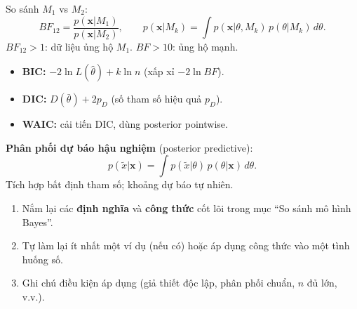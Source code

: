\documentclass[12pt,a4paper]{article}
\begin{document}
\begin{dinhnghia}[title={Bayes factor}]
  So sánh $M_1$ vs $M_2$:
  \[
    BF_{12} = \frac{p(\mathbf{x}|M_1)}{p(\mathbf{x}|M_2)}, \qquad p(\mathbf{x}|M_k) = \int p(\mathbf{x}|\theta, M_k)\,p(\theta|M_k)\,d\theta.
  \]
  $BF_{12} > 1$: dữ liệu ủng hộ $M_1$. $BF > 10$: ủng hộ mạnh.
\end{dinhnghia}

\begin{dinhnghia}[title={Tiêu chuẩn thông tin}]
  \begin{itemize}
    \item \textbf{BIC:} $-2\ln L(\hat{\theta}) + k\ln n$ (xấp xỉ $-2\ln BF$).
    \item \textbf{DIC:} $D(\bar{\theta}) + 2p_D$ (số tham số hiệu quả $p_D$).
    \item \textbf{WAIC:} cải tiến DIC, dùng posterior pointwise.
  \end{itemize}
\end{dinhnghia}

\begin{phuongphap}[title={Dự báo Bayes}]
  \textbf{Phân phối dự báo hậu nghiệm} (posterior predictive):
  \[
    p(\tilde{x}|\mathbf{x}) = \int p(\tilde{x}|\theta)\,p(\theta|\mathbf{x})\,d\theta.
  \]
  Tích hợp bất định tham số; khoảng dự báo tự nhiên.
\end{phuongphap}

\begin{tongket}[title={Tổng kết: So sánh mô hình Bayes}]
\begin{enumerate}
  \item Nắm lại các \textbf{định nghĩa} và \textbf{công thức} cốt lõi trong mục ``So sánh mô hình Bayes''.
  \item Tự làm lại ít nhất một ví dụ (nếu có) hoặc áp dụng công thức vào một tình huống số.
  \item Ghi chú điều kiện áp dụng (giả thiết độc lập, phân phối chuẩn, $n$ đủ lớn, v.v.).
\end{enumerate}
\end{tongket}
\end{document}
